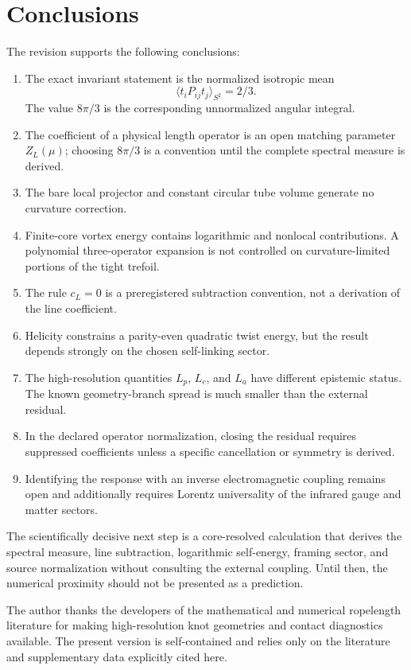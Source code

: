 \documentclass[aps,pre,preprint,notitlepage,nofootinbib,superscriptaddress]{revtex4-2}
\newcommand{\ZL}{Z_L}
\begin{document}
\section{Conclusions}

The revision supports the following conclusions:
\begin{enumerate}[leftmargin=*]
  \item The exact invariant statement is the normalized isotropic mean
  \[
    \langle t_iP_{ij}t_j\rangle_{S^2}=2/3.
  \]
  The value $8\pi/3$ is the corresponding unnormalized angular integral.
  \item The coefficient of a physical length operator is an open matching parameter $\ZL(\mu)$; choosing $8\pi/3$ is a convention until the complete spectral measure is derived.
  \item The bare local projector and constant circular tube volume generate no curvature correction.
  \item Finite-core vortex energy contains logarithmic and nonlocal contributions.  A polynomial three-operator expansion is not controlled on curvature-limited portions of the tight trefoil.
  \item The rule $c_L=0$ is a preregistered subtraction convention, not a derivation of the line coefficient.
  \item Helicity constrains a parity-even quadratic twist energy, but the result depends strongly on the chosen self-linking sector.
  \item The high-resolution quantities $L_p$, $L_c$, and $L_a$ have different epistemic status.  The known geometry-branch spread is much smaller than the external residual.
  \item In the declared operator normalization, closing the residual requires suppressed coefficients unless a specific cancellation or symmetry is derived.
  \item Identifying the response with an inverse electromagnetic coupling remains open and additionally requires Lorentz universality of the infrared gauge and matter sectors.
\end{enumerate}

The scientifically decisive next step is a core-resolved calculation that derives the spectral measure, line subtraction, logarithmic self-energy, framing sector, and source normalization without consulting the external coupling.  Until then, the numerical proximity should not be presented as a prediction.

\begin{acknowledgments}
The author thanks the developers of the mathematical and numerical ropelength literature for making high-resolution knot geometries and contact diagnostics available.  The present version is self-contained and relies only on the literature and supplementary data explicitly cited here.
\end{acknowledgments}
\end{document}

